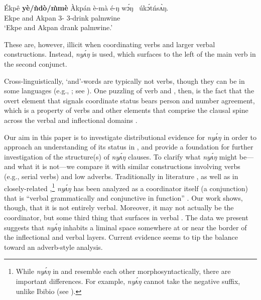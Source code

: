\documentclass[output=paper,modfonts,nonflat,
]{langsci/langscibook}
\begin{document}
\ea\label{ex:duncan-et-al:2}
\gll \'{E}kpê \textbf{y\`{e}/ǹd\`{o}/\`{m}m\`{e}} \`{A}kpán \`{e}-mà é-ŋ w\'ɔŋ~ úk\'ɔtńs\`{ʌ}ŋ. \\
Ekpe and Akpan 3{\PL}-{\PST} 3{\PL}-drink palmwine \\
\glt ‘Ekpe and Akpan drank palmwine.’
\z

\noindent These are, however, illicit when coordinating verbs and larger verbal constructions. Instead, \textit{ny\'{ʌ}ŋ} is used, which surfaces to the left of the main verb in the second conjunct.

\ea\label{ex:duncan-et-al:3}
\z
\z

\noindent Cross-linguistically, `and'-words are typically not verbs, though they can be in some languages (e.g., ; see \citealt{brown2008verbs}). One puzzling  of  verb and , then, is the fact that the overt element that signals coordinate status bears person and number agreement, which is a property of verbs and other elements that comprise the clausal spine across the verbal and inflectional domains \citep{baker2010agreement}.

Our aim in this paper is to investigate distributional evidence for \textit{ny\'{ʌ}ŋ} in order to approach an understanding of its status in , and provide a foundation for further investigation of the structure(s) of \textit{ny\'{ʌ}ŋ} clauses. To clarify what \textit{ny\'{ʌ}ŋ} might be---and what it is not---we compare it with similar constructions involving verbs (e.g., serial verbs) and low adverbs. Traditionally in  literature \citep{essien1985negation,essien1990grammar}, as well as in closely-related  \citep{goldie1857principles,welmers1968efik,welmers1973african},\footnote{While \textit{ny\'{ʌ}ŋ} in  and  resemble each other morphosyntactically, there are important differences. For example,  \textit{ny\'{ʌ}ŋ} cannot take the negative suffix, unlike Ibibio (see ).} \textit{ny\'{ʌ}ŋ} has been analyzed as a coordinator itself (a conjunction) that is ``verbal grammatically and conjunctive in function'' \citep[148]{essien1990grammar}. Our work shows, though, that it is not entirely verbal. Moreover, it may not actually be the coordinator, but some third thing that surfaces in verbal . The data we present suggests that \textit{ny\'{ʌ}ŋ} inhabits a liminal space somewhere at or near the border of the inflectional and verbal layers. Current evidence seems to tip the balance toward an adverb-style analysis.
\end{document}
